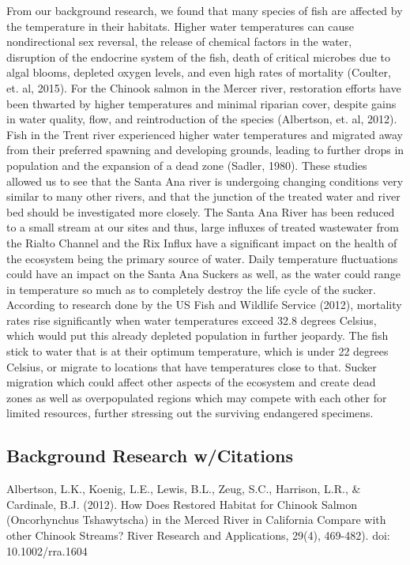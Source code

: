 \documentclass{article}
\begin{document}
From our background research, we found that many species of fish are affected by the temperature in their habitats. Higher water temperatures can cause nondirectional sex reversal, the release of chemical factors in the water, disruption of the endocrine system of the fish, death of critical microbes due to algal blooms, depleted oxygen levels, and even high rates of mortality (Coulter, et. al, 2015). For the Chinook salmon in the Mercer river, restoration efforts have been thwarted by higher temperatures and minimal riparian cover, despite gains in water quality, flow, and reintroduction of the species (Albertson, et. al, 2012). Fish in the Trent river experienced higher water temperatures and migrated away from their preferred spawning and developing grounds, leading to further drops in population and the expansion of a dead zone (Sadler, 1980). These studies allowed us to see that the Santa Ana river is undergoing changing conditions very similar to many other rivers, and that the junction of the treated water and river bed should be investigated more closely. The Santa Ana River has been reduced to a small stream at our sites and thus, large influxes of treated wastewater from the Rialto Channel and the Rix Influx have a significant impact on the health of the ecosystem being the primary source of water. Daily temperature fluctuations could have an impact on the Santa Ana Suckers as well, as the water could range in temperature so much as to completely destroy the life cycle of the sucker. According to research done by the US Fish and Wildlife Service (2012), mortality rates rise significantly when water temperatures exceed 32.8 degrees Celsius, which would put this already depleted population in further jeopardy. The fish stick to water that is at their optimum temperature, which is under 22 degrees Celsius, or migrate to locations that have temperatures close to that. Sucker migration which could affect other aspects of the ecosystem and create dead zones as well as overpopulated regions which may compete with each other for limited resources, further stressing out the surviving endangered specimens. 
 
\subsection{Background Research w/Citations} 

Albertson, L.K., Koenig, L.E., Lewis, B.L., Zeug, S.C., Harrison, L.R., \& Cardinale, B.J. (2012). How Does Restored Habitat for Chinook Salmon (Oncorhynchus Tshawytscha) in the Merced River in California Compare with other Chinook Streams? River Research and Applications, 29(4), 469-482). doi: 10.1002/rra.1604
\end{document}
